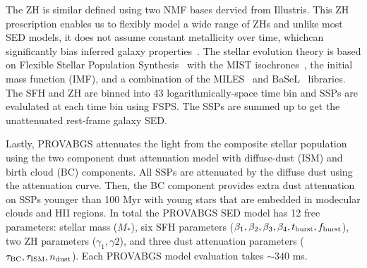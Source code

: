 The ZH is similar defined using two NMF bases dervied from Illustris. 
This ZH prescription enables us to flexibly model a wide range of ZHs and
unlike most SED models, it does not assume constant metallicity over time, whichcan significantly bias inferred galaxy properties~\citep{thorne2021}. 
The stellar evolution theory is based on Flexible Stellar Population
Synthesis~\citep[FSPS;][]{conroy2009, conroy2010c} with the MIST
isochrones~\citep{paxton2011, paxton2013, paxton2015, choi2016, dotter2016},  
the \cite{chabrier2003} initial mass function (IMF), and a combination of the
MILES~\citep{sanchez-blazquez2006} and BaSeL~\citep{lejeune1997, lejeune1998,
westera2002} libraries.
The SFH and ZH are binned into 43 logarithmically-space time bin and SSPs are
evalulated at each time bin using FSPS. 
The SSPs are summed up to get the unattenuated rest-frame galaxy SED. 

Lastly, PROVABGS attenuates the light from the composite stellar population
using the two component \cite{charlot2000} dust attenuation model with
diffuse-dust (ISM) and birth cloud (BC) components. 
All SSPs are attenuated by the diffuse dust using the \cite{kriek2013}
attenuation curve.
Then, the BC component provides extra dust attenuation on SSPs younger than 100
Myr with young stars that are embedded in modecular clouds and HII regions. 
In total the PROVABGS SED model has 12 free parameters: stellar mass ($M_*$),
six SFH parameters ($\beta_1, \beta_2, \beta_3, \beta_4, t_{\rm burst}, f_{\rm
burst}$), two ZH parameters ($\gamma_1, \gamma2$), and three dust attenuation
parameters ($\tau_{\rm BC}, \tau_{\rm ISM}, n_{\rm dust}$). 
Each PROVABGS model evaluation takes ${\sim}340$ ms. 


